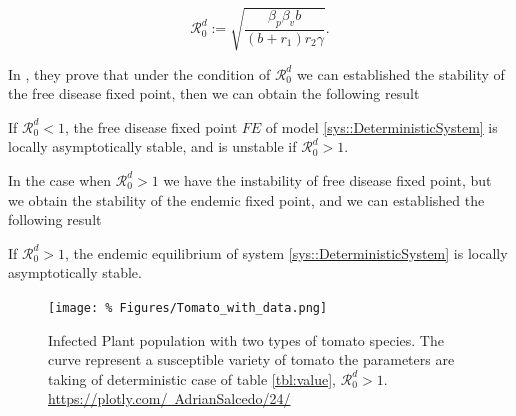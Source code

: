 \begin{equation}\label{eqn::DeterministicBRN}
    \mathcal{R}^d_0:=\sqrt{\frac{\beta_p \beta_v b}{(b + r_1 ) r_2 \gamma}}.
\end{equation}

In \cite{VandenDriessche2017}, they prove that under the condition of $\mathcal{R}^d_0$
we can established the stability of the free disease fixed point, then we can obtain the following result

\begin{theorem}\label{Thm::StabilityFreePointBasicReproNumberDeter}
If $\mathcal{R}^d_0 < 1$, the free disease fixed point $FE$ of model \autoref{sys::DeterministicSystem}
is locally asymptotically stable, and is unstable if $\mathcal{R}^d_0>1$.
\end{theorem}

In the case when $\mathcal{R}^d_0>1$ we have the instability of free disease fixed point,
but we obtain the stability of the endemic fixed point, and we can established the following result

\begin{theorem}{\cite[Thm. ][]{}}
\label{Thm::StabilityEndemicPointBasicReproNumberDeter}
If $\mathcal{R}^d_0>1$, the endemic equilibrium  of system \autoref{sys::DeterministicSystem}
is locally asymptotically stable.
\end{theorem}

\begin{figure}[h]
	\centering	
	\texttt{[image: \%
	Figures/Tomato\_with\_data.png]}
	\caption{Infected Plant population with two types of tomato species. The curve represent
	a susceptible variety of tomato the parameters are taking of deterministic case of table
	\autoref{tbl:value}, $\mathcal{R}^d_0>1$.
		\href{https://plotly.com/~AdrianSalcedo/24/}{
		https://plotly.com/~AdrianSalcedo/24/}}
	\label{fig:Deterministic_Infected_with_data}
\end{figure}